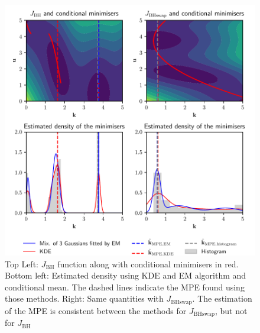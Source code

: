 \documentclass[preprint, 1p]{elsarticle}
\begin{document}

\begin{figure}
  \centering
  \includegraphics[width=12cm]{Figures/branin_side_66.pdf}
  \caption{Top Left:  $J_{\mathrm{BH}}$ function along with conditional minimisers in red. Bottom left: Estimated density using KDE and EM algorithm and conditional mean. The dashed lines indicate the MPE found using those methods. Right: Same quantities with $J_{\mathrm{BHswap}}$. The estimation of the MPE is consistent between the methods for $J_{\mathrm{BHswap}}$, but not for  $J_{\mathrm{BH}}$}
\label{fig:contours}
\end{figure}
\end{document}
